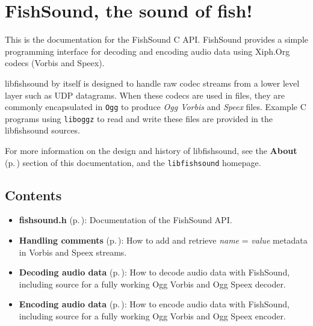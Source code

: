 \section{Fish\-Sound, the sound of fish!}\label{intro}
This is the documentation for the Fish\-Sound C API. Fish\-Sound provides a simple programming interface for decoding and encoding audio data using Xiph.Org codecs (Vorbis and Speex).

libfishsound by itself is designed to handle raw codec streams from a lower level layer such as UDP datagrams. When these codecs are used in files, they are commonly encapsulated in {\tt Ogg} to produce {\em Ogg Vorbis\/} and {\em Speex\/} files. Example C programs using {\tt liboggz} to read and write these files are provided in the libfishsound sources.

For more information on the design and history of libfishsound, see the {\bf About }{\rm (p.\,\pageref{group__about})} section of this documentation, and the {\tt libfishsound} homepage.\subsection{Contents}\label{contents}
\begin{itemize}
\item {\bf fishsound.h }{\rm (p.\,\pageref{fishsound_8h})}: Documentation of the Fish\-Sound API.\end{itemize}


\begin{itemize}
\item {\bf Handling comments }{\rm (p.\,\pageref{comments_8h})}: How to add and retrieve {\em name\/} = {\em value\/} metadata in Vorbis and Speex streams.\end{itemize}


\begin{itemize}
\item {\bf Decoding audio data }{\rm (p.\,\pageref{group__decode})}: How to decode audio data with Fish\-Sound, including source for a fully working Ogg Vorbis and Ogg Speex decoder.\end{itemize}


\begin{itemize}
\item {\bf Encoding audio data }{\rm (p.\,\pageref{group__encode})}: How to encode audio data with Fish\-Sound, including source for a fully working Ogg Vorbis and Ogg Speex encoder.\end{itemize}



